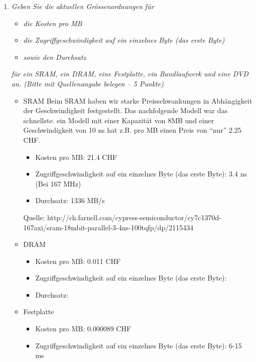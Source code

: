 \documentclass[10pt]{article}
\begin{document}
\begin{enumerate}[label=\alph*)]
	\item
		\textit{Geben Sie die aktuellen Grössenordnungen für}
			\begin{itemize}
				\item \textit{die Kosten pro MB}
				\item \textit{die Zugriffgeschwindigkeit auf ein einzelnes Byte (das erste Byte)}
				\item \textit{sowie den Durchsatz}
			\end{itemize}
		\textit{für ein SRAM, ein DRAM, eine Festplatte, ein Bandlaufwerk und eine DVD an. (Bitte mit Quellenangabe belegen – 5 Punkte)}
			
			\begin{itemize}
				\item SRAM
					Beim SRAM haben wir starke Preisschwankungen in Abhängigkeit der Geschwindigkeit festgestellt. Das nachfolgende Modell war das schnellste. ein Modell mit einer Kapazität von 8MB und einer Geschwindigkeit von 10 ns hat z.B. pro MB einen Preis von "`nur"' 2.25 CHF.
					\begin{itemize}
						\item Kosten pro MB: 21.4 CHF
						\item Zugriffgeschwindigkeit auf ein einzelnes Byte (das erste Byte): 3.4 ns (Bei 167 MHz)
						\item Durchsatz: 1336 MB/s
					\end{itemize}
					Quelle: http://ch.farnell.com/cypress-semiconductor/cy7c1370d-167axi/sram-18mbit-parallel-3-4ns-100tqfp/dp/2115434
				\item DRAM
					\begin{itemize}
						\item Kosten pro MB: 0.011 CHF
						\item Zugriffgeschwindigkeit auf ein einzelnes Byte (das erste Byte):
						\item Durchsatz:
					\end{itemize}
				\item Festplatte
					\begin{itemize}
						\item Kosten pro MB: 0.000089 CHF
						\item Zugriffgeschwindigkeit auf ein einzelnes Byte (das erste Byte): 6-15 ms

\end{itemize}
\end{itemize}
\end{enumerate}
\end{document}
